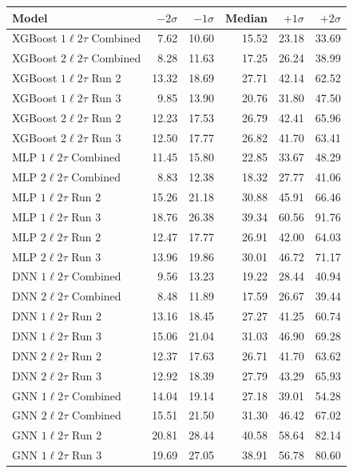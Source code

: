 \begin{table}[h]
\centering
\begin{tabular}{lrrrrr}
\hline
Model & $-2\sigma$ & $-1\sigma$ & Median & $+1\sigma$ & $+2\sigma$ \\
\hline
XGBoost $1\ell 2\tau$ Combined & 7.62 & 10.60 & 15.52 & 23.18 & 33.69 \\
XGBoost $2\ell 2\tau$ Combined & 8.28 & 11.63 & 17.25 & 26.24 & 38.99 \\
XGBoost $1\ell 2\tau$ Run 2 & 13.32 & 18.69 & 27.71 & 42.14 & 62.52 \\
XGBoost $1\ell 2\tau$ Run 3 & 9.85 & 13.90 & 20.76 & 31.80 & 47.50 \\
XGBoost $2\ell 2\tau$ Run 2 & 12.23 & 17.53 & 26.79 & 42.41 & 65.96 \\
XGBoost $2\ell 2\tau$ Run 3 & 12.50 & 17.77 & 26.82 & 41.70 & 63.41 \\
MLP $1\ell 2\tau$ Combined & 11.45 & 15.80 & 22.85 & 33.67 & 48.29 \\
MLP $2\ell 2\tau$ Combined & 8.83 & 12.38 & 18.32 & 27.77 & 41.06 \\
MLP $1\ell 2\tau$ Run 2 & 15.26 & 21.18 & 30.88 & 45.91 & 66.46 \\
MLP $1\ell 2\tau$ Run 3 & 18.76 & 26.38 & 39.34 & 60.56 & 91.76 \\
MLP $2\ell 2\tau$ Run 2 & 12.47 & 17.77 & 26.91 & 42.00 & 64.03 \\
MLP $2\ell 2\tau$ Run 3 & 13.96 & 19.86 & 30.01 & 46.72 & 71.17 \\
DNN $1\ell 2\tau$ Combined & 9.56 & 13.23 & 19.22 & 28.44 & 40.94 \\
DNN $2\ell 2\tau$ Combined & 8.48 & 11.89 & 17.59 & 26.67 & 39.44 \\
DNN $1\ell 2\tau$ Run 2 & 13.16 & 18.45 & 27.27 & 41.25 & 60.74 \\
DNN $1\ell 2\tau$ Run 3 & 15.06 & 21.04 & 31.03 & 46.90 & 69.28 \\
DNN $2\ell 2\tau$ Run 2 & 12.37 & 17.63 & 26.71 & 41.70 & 63.62 \\
DNN $2\ell 2\tau$ Run 3 & 12.92 & 18.39 & 27.79 & 43.29 & 65.93 \\
GNN $1\ell 2\tau$ Combined & 14.04 & 19.14 & 27.18 & 39.01 & 54.28 \\
GNN $2\ell 2\tau$ Combined & 15.51 & 21.50 & 31.30 & 46.42 & 67.02 \\
GNN $1\ell 2\tau$ Run 2 & 20.81 & 28.44 & 40.58 & 58.64 & 82.14 \\
GNN $1\ell 2\tau$ Run 3 & 19.69 & 27.05 & 38.91 & 56.78 & 80.60 \\

\end{tabular}
\end{table}
